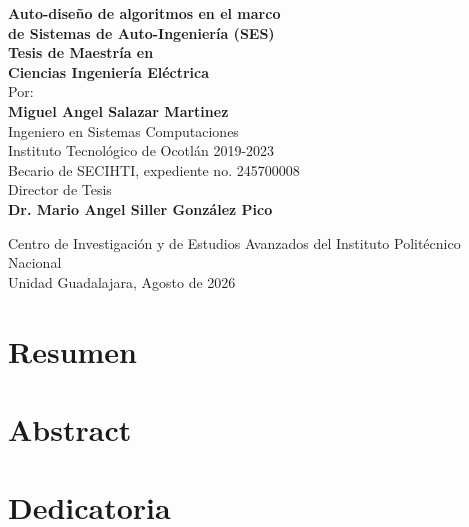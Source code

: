 \documentclass[12pt, letterpaper, oneside]{book}
\begin{document}
\begin{titlepage}
    \begin{center}
        \vspace{2cm}
        
        {\Huge \textbf{Auto-diseño de algoritmos en el marco\\ de Sistemas de Auto-Ingeniería (SES)}}\\[2cm]
        
        {\LARGE \textbf{Tesis de Maestría en \\Ciencias Ingeniería Eléctrica}}\\[1.2cm]
        
        {\large Por:}\\[0.3cm]
        {\LARGE \textbf{Miguel Angel Salazar Martinez}}\\[0.3cm]
        {\Large Ingeniero en Sistemas Computaciones}\\
        {\Large Instituto Tecnológico de Ocotlán 2019-2023}
        \\[1.2cm]
        
        
        {\Large Becario de SECIHTI, expediente no. 245700008}\\[1.2cm]
        
        {\Large Director de Tesis}\\[0.3cm]
        {\LARGE \textbf{Dr. Mario Angel Siller González Pico}}
    \end{center}
    \vfill 
    \noindent 
    {Centro de Investigación y de Estudios Avanzados del Instituto Politécnico Nacional}\\
    \noindent 
    {Unidad Guadalajara, Agosto de 2026}
\end{titlepage}

\chapter*{Resumen}\label{resumen}

\chapter*{Abstract}\label{abstract}

\chapter*{Dedicatoria}\label{dedicatoria}
\end{document}
